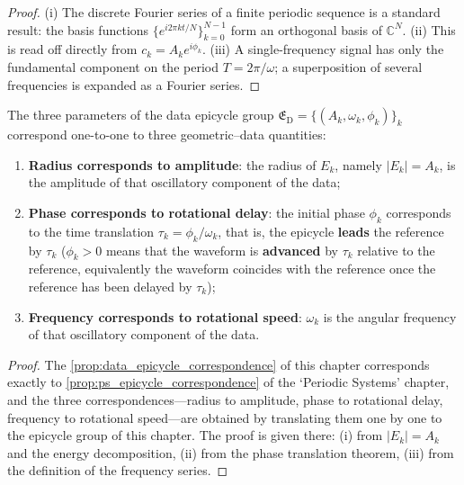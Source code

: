 \begin{proof}
(i) The discrete Fourier series of a finite periodic sequence is a standard result: the basis functions $\{e^{i2\pi kt/N}\}_{k=0}^{N-1}$ form an orthogonal basis of $\mathbb C^N$.
(ii) This is read off directly from $c_k=A_k e^{i\phi_k}$.
(iii) A single-frequency signal has only the fundamental component on the period $T=2\pi/\omega$; a superposition of several frequencies is expanded as a Fourier series.
\end{proof}

\begin{proposition}\label{prop:data_epicycle_correspondence}
The three parameters of the data epicycle group $\mathfrak E_{\mathrm{D}}=\{(A_k,\omega_k,\phi_k)\}_{k}$ correspond one-to-one to three geometric--data quantities:
\begin{enumerate}[label=(\roman*)]
    \item \textbf{Radius corresponds to amplitude}: the radius of $E_k$, namely $|E_k|=A_k$, is the amplitude of that oscillatory component of the data;
    \item \textbf{Phase corresponds to rotational delay}: the initial phase $\phi_k$ corresponds to the time translation $\tau_k=\phi_k/\omega_k$, that is, the epicycle \textbf{leads} the reference by $\tau_k$ ($\phi_k>0$ means that the waveform is \textbf{advanced} by $\tau_k$ relative to the reference, equivalently the waveform coincides with the reference once the reference has been delayed by $\tau_k$);
    \item \textbf{Frequency corresponds to rotational speed}: $\omega_k$ is the angular frequency of that oscillatory component of the data.
\end{enumerate}
\end{proposition}

\begin{proof}
The \cref{prop:data_epicycle_correspondence} of this chapter corresponds exactly to \cref{prop:ps_epicycle_correspondence} of the `Periodic Systems' chapter,
and the three correspondences---radius to amplitude, phase to rotational delay, frequency to rotational speed---are obtained by translating them one by one to the epicycle group of this chapter.
The proof is given there: (i) from $|E_k|=A_k$ and the energy decomposition, (ii) from the phase translation theorem, (iii) from the definition of the frequency series.
\end{proof}

